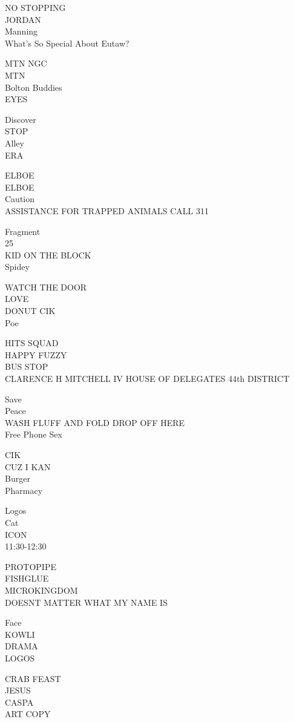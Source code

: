 \documentclass[10pt,letterpaper]{article}
\begin{document}
NO STOPPING\\
JORDAN\\
Manning\\
What's So Special About Eutaw?

MTN NGC\\
MTN\\
Bolton Buddies\\
EYES

Discover\\
STOP\\
Alley\\
ERA

ELBOE\\
ELBOE\\
Caution\\
ASSISTANCE FOR TRAPPED ANIMALS CALL 311

Fragment\\
25\\
KID ON THE BLOCK\\
Spidey

WATCH THE DOOR\\
LOVE\\
DONUT CIK\\
Poe

HITS SQUAD\\
HAPPY FUZZY\\
BUS STOP\\
CLARENCE H MITCHELL IV HOUSE OF DELEGATES 44th DISTRICT

Save\\
Peace\\
WASH FLUFF AND FOLD DROP OFF HERE\\
Free Phone Sex

CIK\\
CUZ I KAN\\
Burger\\
Pharmacy

Logos\\
Cat\\
ICON\\
11:30{-}12:30

PROTOPIPE\\
FISHGLUE\\
MICROKINGDOM\\
DOESNT MATTER WHAT MY NAME IS

Face\\
KOWLI\\
DRAMA\\
LOGOS

CRAB FEAST\\
JESUS\\
CASPA\\
ART COPY
\end{document}
